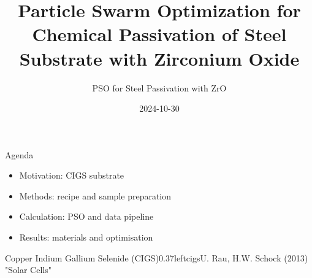 \documentclass[hyperref={pdfpagelabels=false}, aspectratio=43, t]{beamer}  %
\title{Particle Swarm Optimization for Chemical Passivation of Steel Substrate with Zirconium Oxide} %
\subtitle{PSO for Steel Passivation with ZrO}  %
\date{2024-10-30} %
\begin{document}

\maketitle

													



\begin{frame}{Agenda}
	\vspace{2em}
	\begin{itemize}
		\item Motivation: CIGS substrate
		\item Methods: recipe and sample preparation
		\item Calculation: PSO and data pipeline
		\item Results: materials and optimisation
	\end{itemize}
\end{frame}
\begin{graphicsFrame}{Copper Indium Gallium Selenide (CIGS)}{}{0.37}{left}{cigs}{U. Rau, H.W. Schock (2013) "Solar Cells"}
\begin{table}
    \caption{Band gaps of different chalcopyrites (K. Mertens 2015 "Photovoltaik")}
\end{table}
\end{graphicsFrame}
\end{document}
